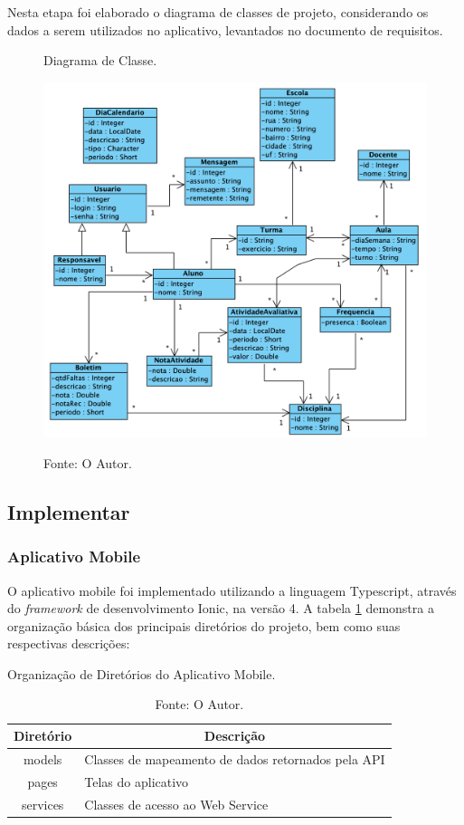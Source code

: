 Nesta etapa foi elaborado o diagrama de classes de projeto, considerando os dados a serem utilizados no aplicativo, levantados no documento de requisitos.

\begin{figure}[H]
	\caption{Diagrama de Classe.}
	\centering %
	\includegraphics[width=16cm]{resources/classes_projeto.png} %
	\label{figura:diagrama_classe}
	\caption*{Fonte: O Autor.}
\end{figure}

\subsection{Implementar}

\subsubsection{Aplicativo Mobile}

O aplicativo mobile foi implementado utilizando a linguagem Typescript, através do \textit{framework} de desenvolvimento Ionic, na versão 4. A tabela \ref{tabela:app_organizacao} demonstra a organização básica dos principais diretórios do projeto, bem como suas respectivas descrições: 

\renewcommand{\arraystretch}{1.5}
\begin{table}[H]
	\centering
	\caption{Organização de Diretórios do Aplicativo Mobile.}
	\label{tabela:app_organizacao}
	\begin{tabular}{c l}
	    \hline
		\multicolumn{1}{l|}{\textbf{Diretório}} & \multicolumn{1}{c}{\textbf{Descrição}}\\
		\hline
		models & Classes de mapeamento de dados retornados pela API  \\
		pages & Telas do aplicativo \\
		services & Classes de acesso ao Web Service \\
		\hline
	\end{tabular}
	\caption*{Fonte: O Autor.}
\end{table}
\renewcommand{\arraystretch}{1}

